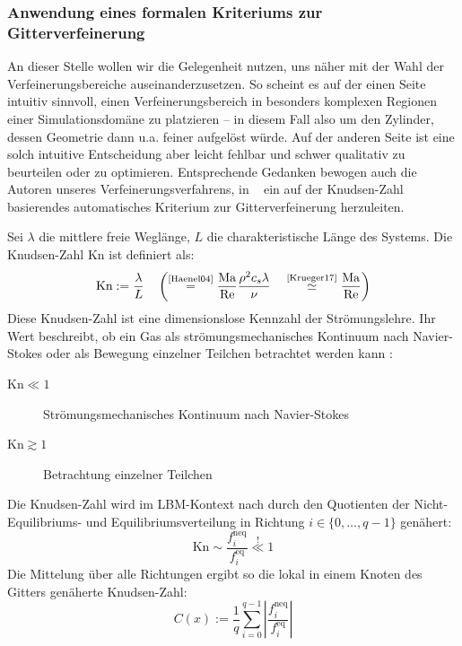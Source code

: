 \subsubsection{Anwendung eines formalen Kriteriums zur Gitterverfeinerung}

An dieser Stelle wollen wir die Gelegenheit nutzen, uns näher mit der Wahl der Verfeinerungsbereiche auseinanderzusetzen. So scheint es auf der einen Seite intuitiv sinnvoll, einen Verfeinerungsbereich in besonders komplexen Regionen einer Simulationsdomäne zu platzieren -- in diesem Fall also um den Zylinder, dessen Geometrie dann u.a. feiner aufgelöst würde. Auf der anderen Seite ist eine solch intuitive Entscheidung aber leicht fehlbar und schwer qualitativ zu beurteilen oder zu optimieren. Entsprechende Gedanken bewogen auch die Autoren unseres Verfeinerungsverfahrens, in ~\cite{Lagrava15} ein auf der Knudsen-Zahl basierendes automatisches Kriterium zur Gitterverfeinerung herzuleiten.

\begin{Definition}
Sei \(\lambda\) die mittlere freie Weglänge, \(L\) die charakteristische Länge des Systems. Die Knudsen-Zahl \(\text{Kn}\) ist definiert als:
\[ \text{Kn} := \frac{\lambda}{L} \quad \left(\overset{\text{\cite[Kap.~1.4.2]{Haenel04}}}{=} \frac{\text{Ma}}{\text{Re}} \frac{\rho^2 c_s \lambda}{\nu} \quad \overset{\text{\cite[Gl.~(7.22)]{Krueger17}}}{\simeq} \frac{\text{Ma}}{\text{Re}}\right) \]
Diese Knudsen-Zahl ist eine dimensionslose Kennzahl der Strömungslehre. Ihr Wert beschreibt, ob ein Gas als strömungsmechanisches Kontinuum nach Navier-Stokes oder als Bewegung einzelner Teilchen betrachtet werden kann \cite[S.~14]{Krueger17}:
\begin{description}
\item[\(\text{Kn} \ll 1\)] Strömungsmechanisches Kontinuum nach Navier-Stokes
\item[\(\text{Kn} \gtrsim 1\)] Betrachtung einzelner Teilchen
\end{description}
\end{Definition}

\begin{Definition}
Die Knudsen-Zahl wird im LBM-Kontext nach \cite[vgl.~(21)]{Lagrava15} durch den Quotienten der Nicht-Equilibriums- und Equilibriumsverteilung in Richtung \(i \in \{0,\dots,q-1\}\) genähert:
\[\text{Kn} \sim \frac{f_i^\text{neq}}{f_i^\text{eq}} \overset{!}{\ll} 1 \]
Die Mittelung über alle Richtungen ergibt so die lokal in einem Knoten des Gitters genäherte Knudsen-Zahl:
\[C(x) := \frac{1}{q} \sum_{i=0}^{q-1} \left|\frac{f_i^\text{neq}}{f_i^\text{eq}}\right|\]
\end{Definition}

